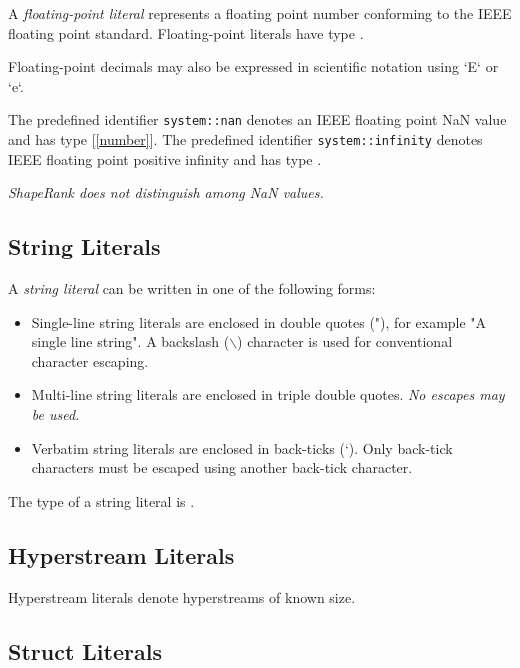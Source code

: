 \documentclass{article}
\begin{document}
A {\em floating-point literal} represents a floating point number conforming to the IEEE floating point standard. Floating-point literals have type \FLOAT{}.

Floating-point decimals may also be expressed in scientific notation using `E` or `e`.

The predefined identifier {\tt system::nan}  denotes an IEEE floating point NaN value and has type \FLOAT{} 
[\ref{number}].
The predefined identifier {\tt system::infinity} denotes IEEE floating point positive infinity and has type \FLOAT{}.

{\em
ShapeRank does not distinguish among NaN values.
}


\subsection{String Literals}
\label{stringLiterals}

A {\em string literal} can be written in one of the following forms:

\StringLiteral{}

\begin{itemize}
\item
Single-line string literals are enclosed in double quotes (\textsf{"}), for example \textsf{"}A single line string\textsf{"}. A backslash ($\backslash$) character is used for conventional character escaping.
\item Multi-line string literals are enclosed in triple double quotes.  {\em No escapes may be used.}
\item Verbatim string literals are enclosed in back-ticks (`). Only back-tick characters must be escaped using another back-tick character.
\end{itemize}

The type of a string literal is \STRING.

\subsection{Hyperstream Literals}
\label{hyperstreamLiterals}

\HyperstreamLiteral

Hyperstream literals denote hyperstreams of known size. 


\subsection{Struct Literals}
\label{structLiterals}
\end{document}
